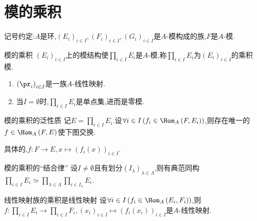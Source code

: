 \section{模的乘积}

记号约定:$A$是环,$\left(E_{i}\right)_{i\in I},\left(F_{i}\right)_{i\in I},\left(G_{i}\right)_{i\in I}$是$A$-模构成的族,$F$是$A$-模.

\begin{definition}{模的乘积}{}
	$\left(E_{i}\right)_{i\in I}$上的模结构使$\prod\limits_{i\in I}E_{i}$是$A$-模,称$\prod\limits_{i\in I}E_{i}$为$\left(E_{i}\right)_{i\in I}$的乘积模.
\end{definition}

\begin{remark}{}{}
	\begin{enumerate}
		\item $\left(\pr_{i}\right)_{i\in I}$是一族$A$-线性映射.
		\item 当$I=\emptyset$时,$\prod\limits_{i\in I}E_{i}$是单点集,进而是零模.
	\end{enumerate}
\end{remark}

\begin{proposition}{模的乘积的泛性质}{}
	记$E=\prod\limits_{i\in I}E_{i}$.设$\forall i\in I\left(f_{i}\in\Hom_{A}\left(F,E_{i}\right)\right)$,则存在唯一的$f\in\Hom_{A}\left(F,E\right)$使下图交换.
	\begin{center}
	\end{center}
	具体的,$f:F\to E,x\mapsto\left(f_{i}\left(x\right)\right)_{i\in I}$.
\end{proposition}

\begin{proposition}{模的乘积的``结合律''}{}
	设$I\neq\emptyset$且有划分$\left(I_{\lambda}\right)_{\lambda\in\Lambda}$,则有典范同构$\prod\limits_{i\in I}E_{i}\simeq\prod\limits_{\lambda\in\Lambda}\prod\limits_{i\in I_{\lambda}}E_{i}$.
\end{proposition}

\begin{proposition}{线性映射族的乘积是线性映射}{}
	设$\forall i\in I\left(f_{i}\in\Hom_{A}\left(E_{i},F_{i}\right)\right)$,则$f:\prod\limits_{i\in I}E_{i}\to\prod\limits_{i\in I}F_{i},\left(x_{i}\right)_{i\in I}\mapsto\left(f_{i}\left(x_{i}\right)\right)_{i\in I}$是$A$-线性映射.
\end{proposition}

